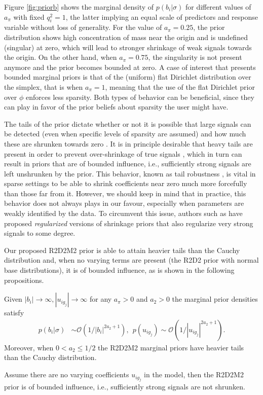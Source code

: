Figure \ref{fig:priorb} shows the marginal density of $p(b_i|\sigma)$ for different values of $a_\pi$ with fixed $q_i^2=1$, the latter implying an equal scale of predictors and response variable without loss of generality. For the value of $a_\pi=0.25$, the prior distribution shows high concentration of mass near the origin and is undefined (singular) at zero, which will lead to stronger shrinkage of weak signals towards the origin. On the other hand, when $a_\pi=0.75$, the singularity is not present anymore and the prior becomes bounded at zero. A case of interest that presents bounded marginal priors is that of the (uniform) flat Dirichlet distribution over the simplex, that is when $a_\pi=1$, meaning that the use of the flat Dirichlet prior over $\phi$ enforces less sparsity. Both types of behavior can be beneficial, since they can play in favor of the prior beliefs about sparsity the user might have.

The tails of the prior dictate whether or not it is possible that large signals can be detected (even when specific levels of sparsity are assumed) and how much these are shrunken towards zero \citep{Horseshoe, DirichletLaplace, vanDP2021theoretical}. It is in principle desirable that heavy tails are present in order to prevent over-shrinkage of true signals \citep{Horseshoe, PiironenHorseshoe}, which in turn can result in priors that are of bounded influence, i.e., sufficiently strong signals are left unshrunken by the prior. This behavior, known as tail robustness \citep{Horseshoe, vanDP2021theoretical}, is vital in sparse settings to be able to shrink coefficients near zero much more forcefully than those far from it. However, we should keep in mind that in practice, this behavior does not always plays in our favour, especially when parameters are weakly identified by the data. To circumvent this issue, authors such as \cite{PiironenHorseshoe, ShrinkingShoulders} have proposed \textit{regularized} versions of shrinkage priors that also regularize very strong signals to some degree.

Our proposed R2D2M2 prior is able to attain heavier tails than the Cauchy distribution and, when no varying terms are present (the R2D2 prior with normal base distributions), it is of bounded influence, as is shown in the following propositions.
\begin{prop}
\label{prop:tailprior}
Given $|b_i|\to \infty, |u_{ig_j}| \to \infty$ for any $a_\pi>0$ and $a_2>0$ the marginal prior densities satisfy
\begin{align*}
 p(b_i|\sigma ) &\sim \mathcal{O}(1/|b_i|^{2a_2+1}), \ \
p(u_{ig_j}) \sim  \mathcal{O}(1/|u_{ig_j}|^{2a_2+1}).
\end{align*}
Moreover, when $0<a_2 \leq 1/2$ the R2D2M2 marginal priors have heavier tails than the Cauchy distribution.
\end{prop}
\begin{prop}
\label{prop:r2d2bounded}
Assume there are no varying coefficients $u_{ig_j}$ in the model, then the R2D2M2 prior is of bounded influence, i.e., sufficiently strong signals are not shrunken.
\end{prop}

